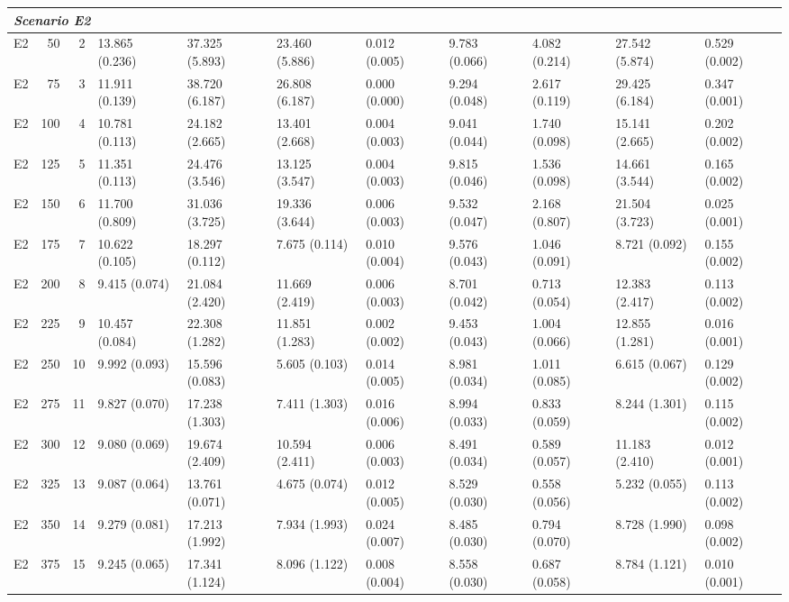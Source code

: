 \begin{tabular}{lrrllllllll}
\multicolumn{11}{l}{\textit{Scenario E2}} \\
\midrule
E2 & 50 & 2 & 13.865 (0.236) & 37.325 (5.893) & 23.460 (5.886) & 0.012 (0.005) & 9.783 (0.066) & 4.082 (0.214) & 27.542 (5.874) & 0.529 (0.002) \\
E2 & 75 & 3 & 11.911 (0.139) & 38.720 (6.187) & 26.808 (6.187) & 0.000 (0.000) & 9.294 (0.048) & 2.617 (0.119) & 29.425 (6.184) & 0.347 (0.001) \\
E2 & 100 & 4 & 10.781 (0.113) & 24.182 (2.665) & 13.401 (2.668) & 0.004 (0.003) & 9.041 (0.044) & 1.740 (0.098) & 15.141 (2.665) & 0.202 (0.002) \\
E2 & 125 & 5 & 11.351 (0.113) & 24.476 (3.546) & 13.125 (3.547) & 0.004 (0.003) & 9.815 (0.046) & 1.536 (0.098) & 14.661 (3.544) & 0.165 (0.002) \\
E2 & 150 & 6 & 11.700 (0.809) & 31.036 (3.725) & 19.336 (3.644) & 0.006 (0.003) & 9.532 (0.047) & 2.168 (0.807) & 21.504 (3.723) & 0.025 (0.001) \\
E2 & 175 & 7 & 10.622 (0.105) & 18.297 (0.112) & 7.675 (0.114) & 0.010 (0.004) & 9.576 (0.043) & 1.046 (0.091) & 8.721 (0.092) & 0.155 (0.002) \\
E2 & 200 & 8 & 9.415 (0.074) & 21.084 (2.420) & 11.669 (2.419) & 0.006 (0.003) & 8.701 (0.042) & 0.713 (0.054) & 12.383 (2.417) & 0.113 (0.002) \\
E2 & 225 & 9 & 10.457 (0.084) & 22.308 (1.282) & 11.851 (1.283) & 0.002 (0.002) & 9.453 (0.043) & 1.004 (0.066) & 12.855 (1.281) & 0.016 (0.001) \\
E2 & 250 & 10 & 9.992 (0.093) & 15.596 (0.083) & 5.605 (0.103) & 0.014 (0.005) & 8.981 (0.034) & 1.011 (0.085) & 6.615 (0.067) & 0.129 (0.002) \\
E2 & 275 & 11 & 9.827 (0.070) & 17.238 (1.303) & 7.411 (1.303) & 0.016 (0.006) & 8.994 (0.033) & 0.833 (0.059) & 8.244 (1.301) & 0.115 (0.002) \\
E2 & 300 & 12 & 9.080 (0.069) & 19.674 (2.409) & 10.594 (2.411) & 0.006 (0.003) & 8.491 (0.034) & 0.589 (0.057) & 11.183 (2.410) & 0.012 (0.001) \\
E2 & 325 & 13 & 9.087 (0.064) & 13.761 (0.071) & 4.675 (0.074) & 0.012 (0.005) & 8.529 (0.030) & 0.558 (0.056) & 5.232 (0.055) & 0.113 (0.002) \\
E2 & 350 & 14 & 9.279 (0.081) & 17.213 (1.992) & 7.934 (1.993) & 0.024 (0.007) & 8.485 (0.030) & 0.794 (0.070) & 8.728 (1.990) & 0.098 (0.002) \\
E2 & 375 & 15 & 9.245 (0.065) & 17.341 (1.124) & 8.096 (1.122) & 0.008 (0.004) & 8.558 (0.030) & 0.687 (0.058) & 8.784 (1.121) & 0.010 (0.001) \\

\end{tabular}
